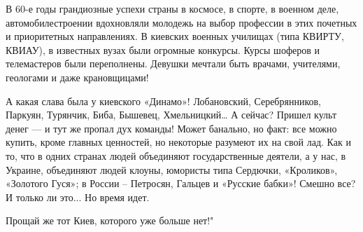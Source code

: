 В 60-е годы грандиозные успехи страны в космосе, в спорте, в военном деле,
автомобилестроении вдохновляли молодежь на выбор профессии в этих почетных и
приоритетных направлениях. В киевских военных училищах (типа КВИРТУ, КВИАУ), в
известных вузах были огромные конкурсы. Курсы шоферов и телемастеров были
переполнены. Девушки мечтали быть врачами, учителями, геологами и даже
крановщицами! 

А какая слава была у киевского «Динамо»! Лобановский, Серебрянников, Паркуян,
Турянчик, Биба, Бышевец, Хмельницкий… А сейчас? Пришел культ денег --- и тут же
пропал дух команды! Может банально, но факт: все можно купить, кроме главных
ценностей, но некоторые разумеют их на свой лад. Как и то, что в одних странах
людей объединяют государственные деятели, а у нас, в Украине, объединяют людей
клоуны, юмористы типа Сердючки, «Кроликов», «Золотого Гуся»; в России –
Петросян, Гальцев и «Русские бабки»! Смешно все? И только ли это... Но время
идет. 

Прощай же тот Киев, которого уже больше нет!"
